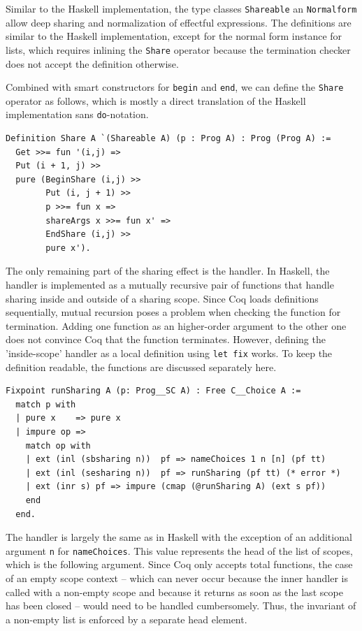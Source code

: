 \documentclass[a4paper, 11pt, fleqn, twoside, abstract=on]{scrreprt}
\newcommand{\hinl}[1]{\texttt{#1}}
\newcommand{\cinl}[1]{\texttt{#1}}
\begin{document}
Similar to the Haskell implementation, the type classes \cinl{Shareable} an \cinl{Normalform} allow deep sharing and normalization of effectful expressions.
The definitions are similar to the Haskell implementation, except for the normal form instance for lists, which requires inlining the \cinl{Share} operator because the termination checker does not accept the definition otherwise.

Combined with smart constructors for \cinl{begin} and \cinl{end}, we can define the \cinl{Share} operator as follows, which is mostly a direct translation of the Haskell implementation sans \hinl{do}-notation.

\begin{verbatim}
Definition Share A `(Shareable A) (p : Prog A) : Prog (Prog A) :=
  Get >>= fun '(i,j) =>
  Put (i + 1, j) >>
  pure (BeginShare (i,j) >>
        Put (i, j + 1) >>
        p >>= fun x =>
        shareArgs x >>= fun x' =>
        EndShare (i,j) >>
        pure x').
\end{verbatim}

The only remaining part of the sharing effect is the handler.
In Haskell, the handler is implemented as a mutually recursive pair of functions that handle sharing inside and outside of a sharing scope.
Since Coq loads definitions sequentially, mutual recursion poses a problem when checking the function for termination.
Adding one function as an higher-order argument to the other one does not convince Coq that the function terminates.
However, defining the 'inside-scope' handler as a local definition using \cinl{let fix} works.
To keep the definition readable, the functions are discussed separately here.

\begin{verbatim}
Fixpoint runSharing A (p: Prog__SC A) : Free C__Choice A :=
  match p with
  | pure x    => pure x
  | impure op =>
    match op with
    | ext (inl (sbsharing n))  pf => nameChoices 1 n [n] (pf tt)
    | ext (inl (sesharing n))  pf => runSharing (pf tt) (* error *)
    | ext (inr s) pf => impure (cmap (@runSharing A) (ext s pf))
    end
  end.
\end{verbatim}

The handler is largely the same as in Haskell with the exception of an additional argument \cinl{n} for \cinl{nameChoices}.
This value represents the head of the list of scopes, which is the following argument.
Since Coq only accepts total functions, the case of an empty scope context -- which can never occur because the inner handler is called with a non-empty scope and because it returns as soon as the last scope has been closed -- would need to be handled cumbersomely.
Thus, the invariant of a non-empty list is enforced by a separate head element.
\end{document}
